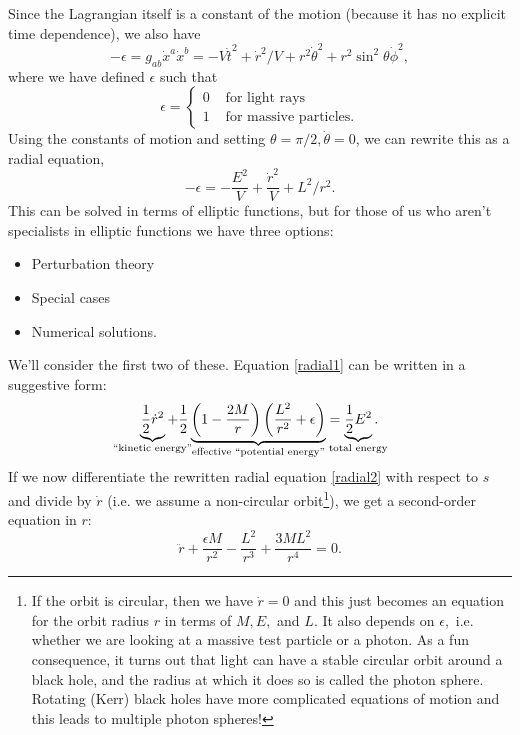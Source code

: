 Since the Lagrangian itself is a constant of the motion (because it has no explicit time dependence), we also have
\begin{equation}
    -\epsilon= g_{ab}\dot x^a \dot x^b =-V\dot t^2 +\dot r^2/V + r^2\dot\theta^2 +r^2\sin^2\theta \dot\phi^2,
\end{equation}
where we have defined $\epsilon$ such that
$$\epsilon=\begin{cases}
0 & \text{ for light rays}\\
1 &\text{ for massive particles}.
\end{cases}$$
Using the constants of motion and setting $\theta=\pi/2,\dot \theta=0$, we can rewrite this as a radial equation,
\begin{equation}\label{radial1}
    -\epsilon = -\frac{E^2}{V}+ \frac{\dot r^2}{V}+L^2/r^2.
\end{equation}
This can be solved in terms of elliptic functions, but for those of us who aren't specialists in elliptic functions we have three options:
\begin{itemize}
    \item Perturbation theory
    \item Special cases
    \item Numerical solutions.
\end{itemize}
%
We'll consider the first two of these. Equation \eqref{radial1} can be written in a suggestive form:
\begin{equation}\label{radial2}
    \underbrace{\frac{1}{2}\dot r^2}_{\mathclap{\text{``kinetic energy''}}} 
    +\frac{1}{2}\underbrace{\left(1-\frac{2M}{r}\right)\left(\frac{L^2}{r^2}+\epsilon\right)}_{\text{effective ``potential energy''}}=\underbrace{\frac{1}{2}E^2}_{\mathclap{\text{total energy}}}.
\end{equation}
If we now differentiate the rewritten radial equation \eqref{radial2} with respect to $s$ and divide by $\dot r$ (i.e. we assume a non-circular orbit\footnote{If the orbit is circular, then we have $\dot r=0$ and this just becomes an equation for the orbit radius $r$ in terms of $M,E,$ and $L$. It also depends on $\epsilon,$ i.e. whether we are looking at a massive test particle or a photon. As a fun consequence, it turns out that light can have a stable circular orbit around a black hole, and the radius at which it does so is called the photon sphere. Rotating (Kerr) black holes have more complicated equations of motion and this leads to multiple photon spheres!}), we get a second-order equation in $r$:
\begin{equation}\label{radial2ndorder}
\ddot r +\frac{\epsilon M}{r^2}-\frac{L^2}{r^3}+\frac{3ML^2}{r^4}=0.
\end{equation}
